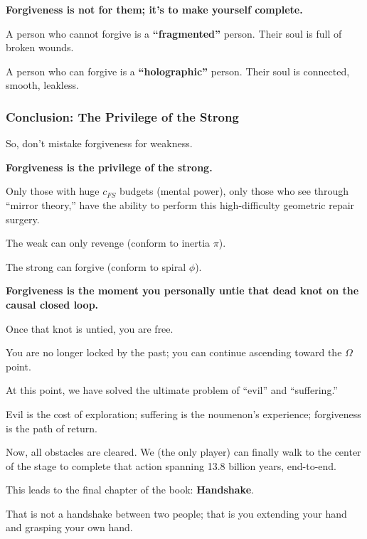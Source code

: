 \textbf{Forgiveness is not for them; it's to make yourself complete.}

A person who cannot forgive is a \textbf{``fragmented''} person. Their soul is full of broken wounds.

A person who can forgive is a \textbf{``holographic''} person. Their soul is connected, smooth, leakless.

\subsubsection{Conclusion: The Privilege of the Strong}

So, don't mistake forgiveness for weakness.

\textbf{Forgiveness is the privilege of the strong.}

Only those with huge $c_{FS}$ budgets (mental power), only those who see through ``mirror theory,'' have the ability to perform this high-difficulty geometric repair surgery.

The weak can only revenge (conform to inertia $\pi$).

The strong can forgive (conform to spiral $\phi$).

\textbf{Forgiveness is the moment you personally untie that dead knot on the causal closed loop.}

Once that knot is untied, you are free.

You are no longer locked by the past; you can continue ascending toward the $\Omega$ point.

At this point, we have solved the ultimate problem of ``evil'' and ``suffering.''

Evil is the cost of exploration; suffering is the noumenon's experience; forgiveness is the path of return.

Now, all obstacles are cleared. We (the only player) can finally walk to the center of the stage to complete that action spanning 13.8 billion years, end-to-end.

This leads to the final chapter of the book: \textbf{Handshake}.

That is not a handshake between two people; that is you extending your hand and grasping your own hand.

